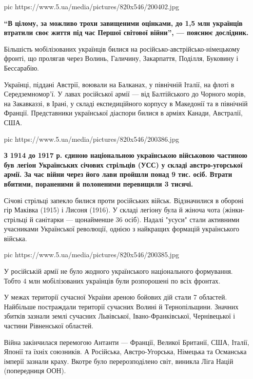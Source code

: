 \ifcmt
pic https://www.5.ua/media/pictures/820x546/200402.jpg
\fi

\begin{leftbar}
	\bfseries
\enquote{В цілому, за можливо трохи завищеними оцінками, до 1,5 млн українців
втратили своє життя під час Першої світової війни}, --- пояснює дослідник.
\end{leftbar}

Більшість мобілізованих українців билися на
російсько-австрійсько-німецькому фронті, що пролягав через Волинь,
Галичину, Закарпаття, Поділля, Буковину і Бессарабію.

Українці, піддані Австрії, воювали на Балканах, у північній Італії, на
флоті в Середземномор'ї. У лавах російської армії --- від Балтійського до
Чорного морів, на Закавказзі, в Ірані, у складі експедиційного корпусу в
Македонії та в північній Франції. Представники української діаспори билися
в арміях Канади, Австралії, США.

\ifcmt
pic https://www.5.ua/media/pictures/820x546/200386.jpg
\fi

\begin{leftbar}
	\bfseries
З 1914 до 1917 р. єдиною національною українською військовою частиною
був легіон Українських січових стрільців (УСС) у складі австро-угорської
армії. За час війни через його лави пройшли понад 9 тис. осіб. Втрати
вбитими, пораненими й полоненими перевищили 3 тисячі.
\end{leftbar}

Січові стрільці запекло билися проти російських військ. Відзначилися в
обороні гір Маківка (1915) і Лисоня (1916). У складі легіону була й жіноча
чота (жінки-стрільці й санітарки --- щонайменше 36 осіб). Надалі "усуси"
стали активними учасниками Української революції, однією з найкращих
формацій українського війська.

\ifcmt
pic https://www.5.ua/media/pictures/820x546/200385.jpg
\fi

У російській армії не було жодного українського національного формування.
Тобто 4 млн мобілізованих українців були розпорошені по всіх фронтах.

У межах території сучасної України ареною бойових дій стали 7 областей.
Найбільше постраждали території сучасних Волині й Тернопільщини. Значних
збитків зазнали землі сучасних Львівської, Івано-Франківської,
Чернівецької і частини Рівненської областей.

Війна закінчилася перемогою Антанти --- Франції, Великої Британії, США,
Італії, Японії та їхніх союзників. А Російська, Австро-Угорська, Німецька
та Османська імперії зазнали краху. Вкотре було перерозподілено світ,
виникла Ліга Націй (попередниця ООН).

